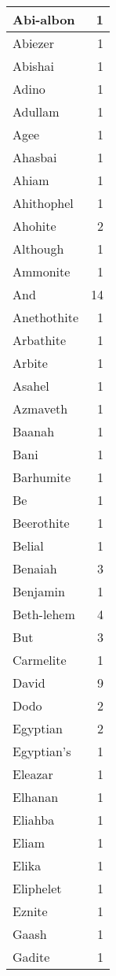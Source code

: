 \begin{center}
\begin{longtable}{l|r}
\hline \hline
\endlastfoot
Abi-albon & 1 \\ \hline
Abiezer & 1 \\ \hline
Abishai & 1 \\ \hline
Adino & 1 \\ \hline
Adullam & 1 \\ \hline
Agee & 1 \\ \hline
Ahasbai & 1 \\ \hline
Ahiam & 1 \\ \hline
Ahithophel & 1 \\ \hline
Ahohite & 2 \\ \hline
Although & 1 \\ \hline
Ammonite & 1 \\ \hline
And & 14 \\ \hline
Anethothite & 1 \\ \hline
Arbathite & 1 \\ \hline
Arbite & 1 \\ \hline
Asahel & 1 \\ \hline
Azmaveth & 1 \\ \hline
Baanah & 1 \\ \hline
Bani & 1 \\ \hline
Barhumite & 1 \\ \hline
Be & 1 \\ \hline
Beerothite & 1 \\ \hline
Belial & 1 \\ \hline
Benaiah & 3 \\ \hline
Benjamin & 1 \\ \hline
Beth-lehem & 4 \\ \hline
But & 3 \\ \hline
Carmelite & 1 \\ \hline
David & 9 \\ \hline
Dodo & 2 \\ \hline
Egyptian & 2 \\ \hline
Egyptian's & 1 \\ \hline
Eleazar & 1 \\ \hline
Elhanan & 1 \\ \hline
Eliahba & 1 \\ \hline
Eliam & 1 \\ \hline
Elika & 1 \\ \hline
Eliphelet & 1 \\ \hline
Eznite & 1 \\ \hline
Gaash & 1 \\ \hline
Gadite & 1 \\ \hline

\end{longtable}
\end{center}
